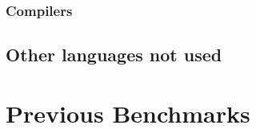 \subsubsection{Compilers}





\subsection{Other languages not used}



\section{Previous Benchmarks}

